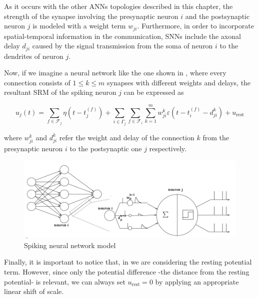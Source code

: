 As it occurs with the other ANNs topologies described in this chapter,
the strength of the synapse involving the presynaptic neuron $i$ and the postsynaptic neuron $j$ is modeled with a weight term $w_{ji}$.
Furthermore, in order to incorporate spatial-temporal information in the communication, SNNs include the axonal delay $d_{ji}$ caused by the signal transmission from the soma of neuron $i$ to the dendrites of neuron $j$.

Now, if we imagine a neural network like the one shown in , 
where every connection consists of $1 \leq k \leq m$ synapses with different weights and delays, 
the resultant SRM of the spiking neuron $j$ can be expressed as

\begin{equation}
u_{j}(t)=
\sum_{f\in \mathcal{F}_{j}}\eta(t-t_{j}^{(f)})+
\sum_{i\in \Gamma_{j}}
\sum_{f\in \mathcal{F}_{i}}
\sum_{k=1}^{m}
	w_{ji}^{k}\varepsilon(t-t_{i}^{(f)}-d_{ji}^k)+u_{\text{rest}}
\label{eq:srmmultipleconnections}
\end{equation}

where $w_{ji}^k$ and $d_{ji}^k$ refer the weight and delay of the connection $k$ from the presynaptic neuron $i$ to the postsynaptic one $j$ respectively.

\begin{figure}[!ht]
\centering
\includegraphics[width=1\textwidth]{images/snn.png}
\caption{Spiking neural network model}
\label{fig:snn}
\end{figure} 

Finally, it is important to notice that, in  we are considering the resting potential term. However, since only the potential difference -the distance from the resting potential- is relevant, we can always set $u_{\text{rest}}=0$ by applying an appropriate linear shift of scale.